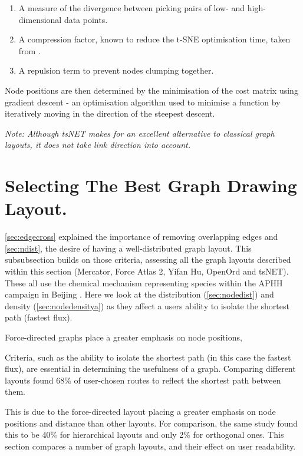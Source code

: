 \begin{enumerate}
    \item A measure of the divergence between picking pairs of low- and high-dimensional data points.
    \item A compression factor, known to reduce the t-SNE optimisation time, taken from \citep{tsnetcompression}.
    \item A repulsion term to prevent nodes clumping together.
\end{enumerate}
    
Node positions are then determined by the minimisation of the cost matrix using gradient descent - an optimisation algorithm used to minimise a function by iteratively moving in the direction of the steepest descent. 

\textit{Note: Although tsNET makes for an excellent alternative to classical graph layouts, it does not take link direction into account. }



\section{Selecting The Best Graph Drawing Layout.}

\autoref{sec:edgecross} explained the importance of removing overlapping edges and \autoref{sec:ndist}, the desire of having a well-distributed graph layout. This subsubsection builds on those criteria, assessing all the graph layouts described within this section (Mercator, Force Atlas 2, Yifan Hu, OpenOrd and tsNET). These all use the chemical mechanism representing species within the APHH campaign in Beijing \citep{aphh}. Here we look at the distribution (\autoref{sec:nodedist}) and density (\autoref{sec:nodedensitya}) as they affect a users ability to isolate the shortest path (fastest flux).

 Force-directed graphs place a greater emphasis on node positions,





Criteria, such as the ability to isolate the shortest path (in this case the fastest flux), are essential in determining the usefulness of a graph. Comparing different layouts \citep{eyetrack} found 68\% of user-chosen routes to reflect the shortest path between them. 

This is due to the force-directed layout placing a greater emphasis on node positions and distance than other layouts. For comparison, the same study found this to be 40\% for hierarchical layouts and only 2\% for orthogonal ones. This section compares a number of graph layouts, and their effect on user readability.


